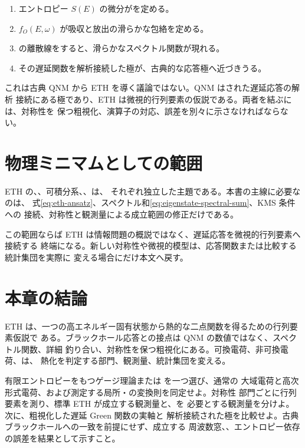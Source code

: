 \begin{enumerate}[label=(\roman*),leftmargin=2.8em]
\item エントロピー $S(E)$ の微分がを定める。
\item $f_O(E,\omega)$ が吸収と放出の滑らかな包絡を定める。
\item {}の離散線をすると、滑らかなスペクトル関数が現れる。
\item その遅延関数を解析接続した極が、古典的な応答極へ近づきうる。
\end{enumerate}

これは古典 QNM から ETH を導く議論ではない。QNM はされた遅延応答の解析
接続にある極であり、ETH は微視的行列要素の仮説である。両者を結ぶには、対称性を
保つ粗視化、演算子の対応、誤差を別々に示さなければならない。

\section{物理ミニマムとしての範囲}

ETH の、、可積分系、、は、
それぞれ独立した主題である。本書の主線に必要なのは、
式\eqref{eq:eth-ansatz}、スペクトル和\eqref{eq:eigenstate-spectral-sum}、KMS 条件への
接続、対称性と観測量による成立範囲の修正だけである。

この範囲ならば ETH は情報問題の概説ではなく、遅延応答を微視的行列要素へ接続する
終端になる。新しい対称性や微視的模型は、応答関数または比較する統計集団を実際に
変える場合にだけ本文へ戻す。

\section{本章の結論}

ETH は、一つの高エネルギー固有状態から熱的な二点関数を得るための行列要素仮説で
ある。ブラックホール応答との接点は QNM の数値ではなく、スペクトル関数、詳細
釣り合い、対称性を保つ粗視化にある。可換電荷、非可換電荷、は、
熱化を判定する部門、観測量、統計集団を変える。

\begin{researchproblem}
有限エントロピーをもつゲージ理論または  を一つ選び、通常の
大域電荷と高次形式電荷、および測定する局所・の変換則を同定せよ。対称性
部門ごとに行列要素を測り、標準 ETH が成立する観測量と、を
必要とする観測量を分けよ。次に、粗視化した遅延 Green 関数の実軸と
解析接続された極を比較せよ。古典ブラックホールへの一致を前提にせず、成立する
周波数窓、、エントロピー依存の誤差を結果として示すこと。
\end{researchproblem}
